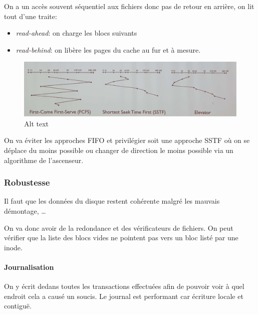 On a un accès souvent séquentiel aux fichiers donc pas de retour en
arrière, on lit tout d'une traite:

\begin{itemize}
\tightlist
\item
  \emph{read-ahead}: on charge les blocs suivants
\item
  \emph{read-behind}: on libère les pages du cache au fur et à mesure.
\end{itemize}

\begin{figure}
\centering
\includegraphics{Drawboard-PDF-Annotation-Copy.png}
\caption{Alt text}
\end{figure}

On va éviter les approches FIFO et privilégier soit une approche SSTF où
on se déplace du moins possible ou changer de direction le moins
possible via un algorithme de l'ascenseur.

\subsubsection{Robustesse}\label{robustesse}

Il faut que les données du disque restent cohérente malgré les mauvais
démontage, \ldots{}

On va donc avoir de la redondance et des vérificateurs de fichiers. On
peut vérifier que la liste des blocs vides ne pointent pas vers un bloc
listé par une inode.

\paragraph{Journalisation}\label{journalisation}

On y écrit dedans toutes les transactions effectuées afin de pouvoir
voir à quel endroit cela a causé un soucis. Le journal est performant
car écriture locale et contiguë.
